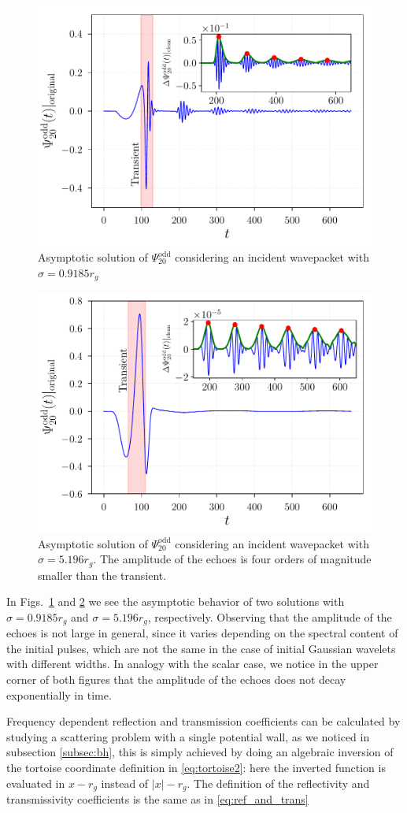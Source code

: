 \documentclass[article,aps,nofootinbib,twocolumn,superscriptaddress]{revtex4-1}
\begin{document}
\begin{figure}[t!]
\centering
\includegraphics[width=.45\textwidth]{figures/Odd_echo_w_09185.pdf}
\caption{\label{fig:odd_sigma_small} Asymptotic solution of $\Psi^{\mathrm{odd}}_{20}$ considering an incident wavepacket with $\sigma=0.9185r_g$}
\end{figure}

\begin{figure}[t!]
\centering
\includegraphics[width=.45\textwidth]{figures/Odd_echo.pdf}
\caption{\label{fig:odd_sigma_large} Asymptotic solution of $\Psi^{\mathrm{odd}}_{20}$ considering an incident wavepacket with $\sigma=5.196r_g$. The amplitude of the echoes is four orders of magnitude smaller than the transient.}
\end{figure}


In Figs.~\ref{fig:odd_sigma_small} and \ref{fig:odd_sigma_large} we see the asymptotic behavior of two solutions with $\sigma=0.9185r_g$ and $\sigma=5.196r_g$, respectively. Observing that the amplitude of the echoes is not large in general, since it varies depending on the spectral content of the initial pulses, which are not the same in the case of initial Gaussian wavelets with different widths. In analogy with the scalar case, we notice in the upper corner of both figures that the amplitude of the echoes does not decay exponentially in time.
\par
Frequency dependent reflection and transmission coefficients can be calculated by studying a scattering problem with a single potential wall, as we noticed in subsection \ref{subsec:bh}, this is simply achieved by doing an algebraic inversion of the tortoise coordinate definition in \eqref{eq:tortoise2}: here the inverted function is evaluated in $x-r_g$ instead of $|x|-r_g$. The definition of the reflectivity and transmissivity coefficients is the same as in \eqref{eq:ref_and_trans}
\end{document}
